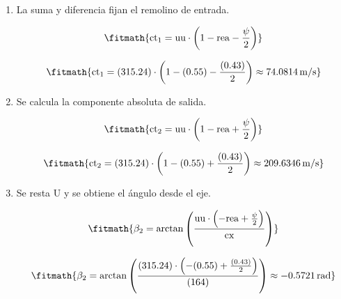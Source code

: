 \begin{enumerate}

\item La suma y diferencia fijan el remolino de entrada.

\[\fitmath{\mathrm{ct}_{1}=\mathrm{uu}\cdot \left(1-\mathrm{rea}-\frac{\psi}{2}\right)}\]

\[\fitmath{\mathrm{ct}_{1}=(315.24)\cdot \left(1-(0.55)-\frac{(0.43)}{2}\right)\approx 74.0814\,\mathrm{m/s}}\]

\item Se calcula la componente absoluta de salida.

\[\fitmath{\mathrm{ct}_{2}=\mathrm{uu}\cdot \left(1-\mathrm{rea}+\frac{\psi}{2}\right)}\]

\[\fitmath{\mathrm{ct}_{2}=(315.24)\cdot \left(1-(0.55)+\frac{(0.43)}{2}\right)\approx 209.6346\,\mathrm{m/s}}\]

\item Se resta U y se obtiene el ángulo desde el eje.

\[\fitmath{\beta_{2}=\arctan\left(\frac{\mathrm{uu}\cdot \left(-\mathrm{rea}+\frac{\psi}{2}\right)}{\mathrm{cx}}\right)}\]

\[\fitmath{\beta_{2}=\arctan\left(\frac{(315.24)\cdot \left(-(0.55)+\frac{(0.43)}{2}\right)}{(164)}\right)\approx -0.5721\,\mathrm{rad}}\]

\end{enumerate}
